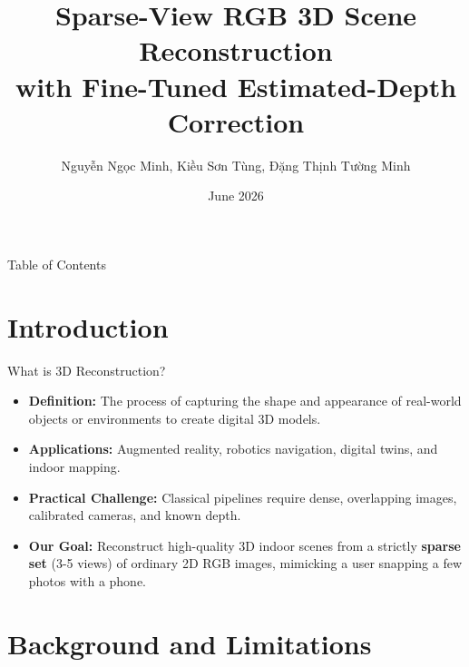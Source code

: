 \documentclass[aspectratio=169]{beamer}
\title[Sparse-View RGB + Estimated Depth]{Sparse-View RGB 3D Scene Reconstruction\\with Fine-Tuned Estimated-Depth Correction}
\author[CV Team]{Nguyễn Ngọc Minh, Kiều Sơn Tùng, Đặng Thịnh Tường Minh}
\institute[IT4343E]{IT4343E - Computer Vision}
\date{June 2026}
\begin{document}
\begin{frame}
    \titlepage
\end{frame}

\begin{frame}{Table of Contents}
    \tableofcontents
\end{frame}

\section{Introduction}

\begin{frame}{What is 3D Reconstruction?}
    \begin{itemize}
        \item \textbf{Definition:} The process of capturing the shape and appearance of real-world objects or environments to create digital 3D models.
        \item \textbf{Applications:} Augmented reality, robotics navigation, digital twins, and indoor mapping.
        \item \textbf{Practical Challenge:} Classical pipelines require dense, overlapping images, calibrated cameras, and known depth. 
        \item \textbf{Our Goal:} Reconstruct high-quality 3D indoor scenes from a strictly \textbf{sparse set} (3-5 views) of ordinary 2D RGB images, mimicking a user snapping a few photos with a phone.
    \end{itemize}
\end{frame}

\section{Background and Limitations}
\end{document}
